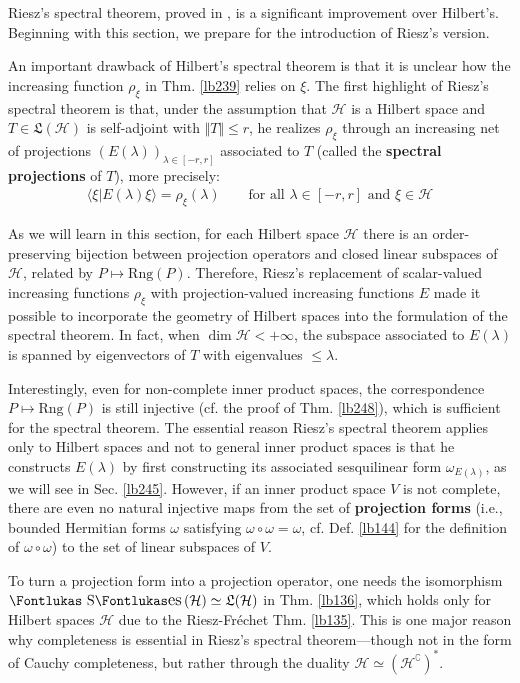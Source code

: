 \documentclass[12pt,b5paper,notitlepage]{article}
\theoremstyle{definition}
\theoremstyle{plain}
\DeclareMathOperator{\Ses}{\text{\Fontlukas S}\text{\kern -0pt {\Fontlukas\large es}}\,}
\newcommand{\fk}{\mathfrak}
\newcommand{\bk}[1]{\langle {#1}\rangle}
\newcommand{\Co}{\complement}
\newcommand{\Rng}{\mathrm{Rng}}
\newcommand{\MH}{\mathcal H}
\numberwithin{equation}{section}
\begin{document}
Riesz's spectral theorem, proved in \cite[Ch. V]{Rie13}, is a significant improvement over Hilbert's. Beginning with this section, we prepare for the introduction of Riesz's version.

An important drawback of Hilbert's spectral theorem is that it is unclear how the increasing function $\rho_\xi$ in Thm. \ref{lb239} relies on $\xi$. The first highlight of Riesz's spectral theorem is that, under the assumption that $\MH$ is a Hilbert space and $T\in\fk L(\MH)$ is self-adjoint with $\Vert T\Vert\leq r$, he realizes $\rho_\xi$ through an increasing net of projections $(E(\lambda))_{\lambda\in[-r,r]}$ associated to $T$ (called the \textbf{spectral projections} of $T$), more precisely:
\begin{align*}
\bk{\xi|E(\lambda)\xi}=\rho_\xi(\lambda)\qquad\text{for all }\lambda\in[-r,r]\text{ and }\xi\in\MH
\end{align*}

As we will learn in this section, for each Hilbert space $\MH$ there is an order-preserving bijection between projection operators and closed linear subspaces of $\MH$, related by $P\mapsto \Rng(P)$. Therefore, Riesz's replacement of scalar-valued increasing functions $\rho_\xi$ with projection-valued increasing functions $E$ made it possible to incorporate the geometry of Hilbert spaces into the formulation of the spectral theorem. In fact, when $\dim \MH<+\infty$, the subspace associated to $E(\lambda)$ is spanned by eigenvectors of $T$ with eigenvalues $\leq\lambda$.


Interestingly, even for non-complete inner product spaces, the correspondence $P\mapsto\Rng(P)$ is still injective (cf. the proof of Thm. \ref{lb248}), which is sufficient for the spectral theorem. The essential reason Riesz's spectral theorem applies only to Hilbert spaces and not to general inner product spaces is that he constructs $E(\lambda)$ by first constructing its associated sesquilinear form $\omega_{E(\lambda)}$, as we will see in Sec. \ref{lb245}. However, if an inner product space $V$ is not complete, there are even no natural injective maps from the set of \textbf{projection forms}  (i.e., bounded Hermitian forms $\omega$ satisfying $\omega\circ\omega=\omega$, cf. Def. \ref{lb144} for the definition of $\omega\circ\omega$) to the set of linear subspaces of $V$. 

To turn a projection form into a projection operator, one needs the isomorphism $\Ses(\MH)\simeq\fk L(\MH)$ in Thm. \ref{lb136}, which holds only for Hilbert spaces $\MH$ due to the Riesz-Fr\'echet Thm. \ref{lb135}. This is one major reason why completeness is essential in Riesz's spectral theorem---though not in the form of Cauchy completeness, but rather through the duality $\MH\simeq(\MH^\Co)^*$. 
\end{document}
